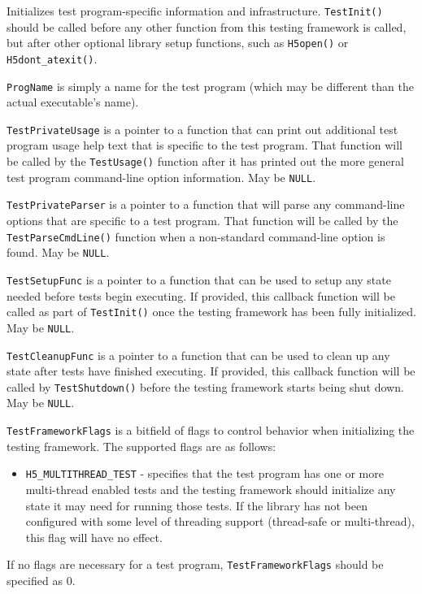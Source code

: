 \documentclass[../HDF5_RFC.tex]{subfiles}
\begin{document}
Initializes test program-specific information and infrastructure. \texttt{TestInit()} should be
called before any other function from this testing framework is called, but after other optional
library setup functions, such as \texttt{H5open()} or \texttt{H5dont\_atexit()}.

\texttt{ProgName} is simply a name for the test program (which may be different than the actual
executable's name).

\texttt{TestPrivateUsage} is a pointer to a function that can print out additional test program usage
help text that is specific to the test program. That function will be called by the \texttt{TestUsage()}
function after it has printed out the more general test program command-line option information. May
be \texttt{NULL}.

\texttt{TestPrivateParser} is a pointer to a function that will parse any command-line options that are
specific to a test program. That function will be called by the \texttt{TestParseCmdLine()} function when
a non-standard command-line option is found. May be \texttt{NULL}.

\texttt{TestSetupFunc} is a pointer to a function that can be used to setup any state needed before tests
begin executing. If provided, this callback function will be called as part of \texttt{TestInit()} once
the testing framework has been fully initialized. May be \texttt{NULL}.

\texttt{TestCleanupFunc} is a pointer to a function that can be used to clean up any state after tests
have finished executing. If provided, this callback function will be called by \texttt{TestShutdown()}
before the testing framework starts being shut down. May be \texttt{NULL}.

\texttt{TestFrameworkFlags} is a bitfield of flags to control behavior when initializing the testing
framework. The supported flags are as follows:

\begin{itemize}
    \item \texttt{H5\_MULTITHREAD\_TEST} - specifies that the test program has one or more multi-thread
          enabled tests and the testing framework should initialize any state it may need for running
          those tests. If the library has not been configured with some level of threading support
          (thread-safe or multi-thread), this flag will have no effect.
\end{itemize}

If no flags are necessary for a test program, \texttt{TestFrameworkFlags} should be specified as 0.
\end{document}
